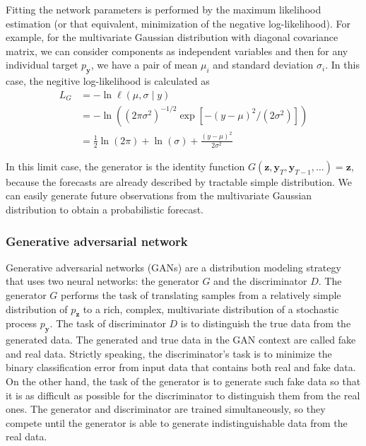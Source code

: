 \documentclass[12pt,a4paper]{article}
\begin{document}
Fitting the network parameters is performed by the maximum likelihood estimation (or that equivalent, minimization of the negative log-likelihood). For example, for the multivariate Gaussian distribution with diagonal covariance matrix, we can consider components as independent variables and then for any individual target $p_\mathbf y$, we have a pair of mean $\mu_i$ and standard deviation $\sigma_i$. In this case, the negitive log-likelihood is calculated as
$$\begin{aligned}
L_{G} &=-\ln \ell(\mu, \sigma \mid y) \\
&=-\ln \left(\left(2 \pi \sigma^{2}\right)^{-1 / 2} \exp \left[-(y-\mu)^{2} /\left(2 \sigma^{2}\right)\right]\right) \\
&=\frac{1}{2} \ln (2 \pi)+\ln (\sigma)+\frac{(y-\mu)^{2}}{2 \sigma^{2}}
\end{aligned}$$

In this limit case, the generator is the identity function $G(\mathbf z, \mathbf y_{T}, \mathbf y_{T-1}, \dots) = \mathbf z$, because the forecasts are already described by tractable simple distribution. We can easily generate future observations from the multivariate Gaussian distribution to obtain a probabilistic forecast.

\subsubsection{Generative adversarial network}\label{gan}

Generative adversarial networks (GANs) are a distribution modeling strategy that uses two neural networks: the generator $G$ and the discriminator $D$. The generator $G$ performs the task of translating samples from a relatively simple distribution of $p_\mathbf z$ to a rich, complex, multivariate distribution of a stochastic process $p_\mathbf y$. The task of discriminator $D$ is to distinguish the true data from the generated data. The generated and true data in the GAN context are called fake and real data. Strictly speaking, the discriminator's task is to minimize the binary classification error from input data that contains both real and fake data. On the other hand, the task of the generator is to generate such fake data so that it is as difficult as possible for the discriminator to distinguish them from the real ones. The generator and discriminator are trained simultaneously, so they compete until the generator is able to generate indistinguishable data from the real data.
\end{document}
